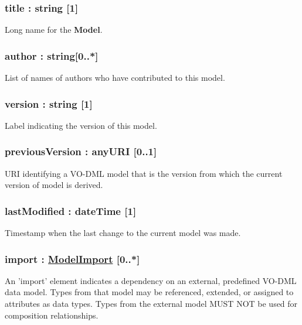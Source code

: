 \documentclass[10pt,a4paper]{ivoa}
\begin{document}
\hypertarget{title-string-1}{%
\subsubsection{title : string {[}1{]}}\label{title-string-1}}

Long name for the \textbf{Model}.

\hypertarget{author-string0..}{%
\subsubsection{author : string{[}0..*{]}}\label{author-string0..}}

List of names of authors who have contributed to this model.

\hypertarget{version-string-1}{%
\subsubsection{version : string {[}1{]}}\label{version-string-1}}

Label indicating the version of this model.

\hypertarget{previousversion-anyuri-0..1}{%
\subsubsection{previousVersion : anyURI
{[}0..1{]}}\label{previousversion-anyuri-0..1}}

URI identifying a VO-DML model that is the version from which the
current version of model is derived.

\hypertarget{lastmodified-datetime-1}{%
\subsubsection{lastModified : dateTime
{[}1{]}}\label{lastmodified-datetime-1}}

Timestamp when the last change to the current model was made.

\hypertarget{import-modelimport-0..}{%
\subsubsection{\texorpdfstring{import :
\protect\hyperlink{modelimport}{ModelImport}
{[}0..*{]}}{import : ModelImport {[}0..*{]}}}\label{import-modelimport-0..}}

An 'import' element indicates a dependency on an external, predefined
VO-DML data model. Types from that model may be referenced, extended, or
assigned to attributes as data types. Types from the external model MUST
NOT be used for composition relationships.
\end{document}
